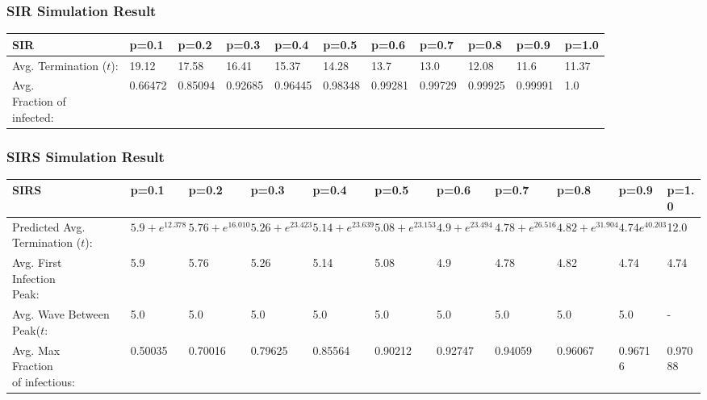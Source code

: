 \documentclass{subfile}
\begin{document}
  \subsubsection{SIR Simulation Result}
  {
  \begin{adjustbox}{max width=1.1\textwidth,center}
  \begin{tabular}{|l|l|l|l|l|l|l|l|l|l|l|}
    \hline
    SIR & p=0.1 & p=0.2 & p=0.3 & p=0.4 & p=0.5 & p=0.6 & p=0.7 & p=0.8 & p=0.9 & p=1.0\\
    \hline
    \makecell{Avg.\\Termination\\(\(t\)):} & 19.12 & 17.58 & 16.41 & 15.37 & 14.28 & 13.7 & 13.0 & 12.08 & 11.6 & 11.37\\
    \hline
    \makecell{Avg.\\Fraction of\\ infected:} & 0.66472 & 0.85094 & 0.92685 & 0.96445 & 0.98348 & 0.99281 & 0.99729 & 0.99925 & 0.99991 & 1.0\\
    \hline
  \end{tabular}
  \end{adjustbox}}

  \subsubsection{SIRS Simulation Result}
  {
  \begin{adjustbox}{max width=1.2\textwidth,center}
  \begin{tabular}{|l|l|l|l|l|l|l|l|l|l|l|}
    \hline
    SIRS & p=0.1 & p=0.2 & p=0.3 & p=0.4 & p=0.5 & p=0.6 & p=0.7 & p=0.8 & p=0.9 & p=1.0\\
    \hline
    \makecell{Predicted\\Avg.\\Termination\\(\(t\))}: & \(5.9 + e^{12.378}\) & \(5.76 + e^{16.010}\) & \(5.26 + e^{23.423}\) & \(5.14 + e^{23.639}\) & \(5.08+e^{23.153}\) & \(4.9+e^{23.494}\) & \(4.78+e^{26.516}\) & \(4.82+e^{31.904}\) & \(4.74e^{40.203}\) & 12.0\footnotemark\\
    \hline
    \makecell{Avg. First\\Infection\\Peak:} & 5.9 & 5.76 & 5.26 & 5.14 & 5.08 & 4.9 & 4.78 & 4.82 & 4.74 & 4.74\\
    \hline
    \makecell{Avg. Wave\\Between Peak(\(t\):} & 5.0 & 5.0 & 5.0 & 5.0 & 5.0 & 5.0 & 5.0 & 5.0 & 5.0 & -\footnotemark\\
    \hline
    \makecell{Avg. Max\\Fraction\\of infectious:} & 0.50035 &  0.70016 & 0.79625 & 0.85564 & 0.90212 & 0.92747 & 0.94059 & 0.96067 & 0.96716 & 0.97088\\
    \hline
  \end{tabular}
  \end{adjustbox}}
\end{document}
